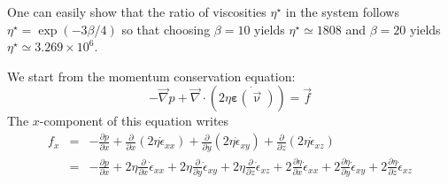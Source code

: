 One can easily show that the ratio of viscosities $\eta^\star$
in the system follows $\eta^\star=\exp(-3\beta/4)$ so that choosing $\beta=10$ yields
$\eta^\star\simeq 1808$ and $\beta=20$ yields $\eta^\star\simeq 3.269\times10^6$.


We start from the momentum conservation equation:
\[
-{\vec \nabla}p + {\vec \nabla}\cdot (2 \eta \dot{\bm \varepsilon(\vec\upnu)}) = {\vec f}
\]
The $x$-component of this equation writes
\begin{eqnarray}
f_x 
&=& -\frac{\partial p}{\partial x} 
+\frac{\partial}{\partial x} (2\eta \dot{\epsilon}_{xx})
+\frac{\partial}{\partial y} (2\eta \dot{\epsilon}_{xy})
+\frac{\partial}{\partial z} (2\eta \dot{\epsilon}_{xz}) \\
&=& 
-\frac{\partial p}{\partial x} 
+2\eta\frac{\partial}{\partial x} \dot{\epsilon}_{xx}
+2\eta\frac{\partial}{\partial y} \dot{\epsilon}_{xy}
+2\eta\frac{\partial}{\partial z} \dot{\epsilon}_{xz} 
+2\frac{\partial \eta}{\partial x} \dot{\epsilon}_{xx}
+2\frac{\partial \eta}{\partial y} \dot{\epsilon}_{xy}
+2\frac{\partial \eta}{\partial z} \dot{\epsilon}_{xz} 
\end{eqnarray}


